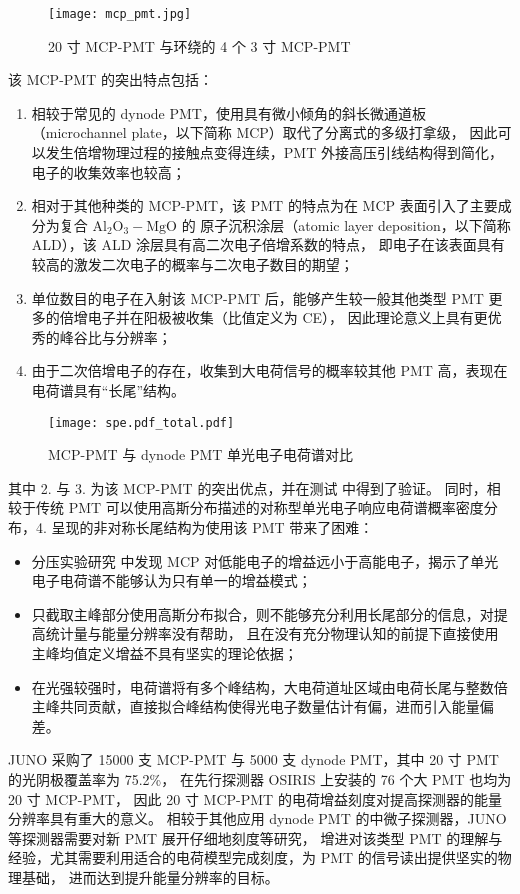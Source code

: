 \begin{figure}
    \centering
    \texttt{[image: mcp\_pmt.jpg]}
    \caption{20 寸 MCP-PMT 与环绕的 4 个 3 寸 MCP-PMT}
\end{figure}

该 MCP-PMT 的突出特点包括：
\begin{enumerate}
    \item 相较于常见的 dynode PMT，使用具有微小倾角的斜长微通道板（microchannel plate，以下简称 MCP）取代了分离式的多级打拿级，
    因此可以发生倍增物理过程的接触点变得连续，PMT 外接高压引线结构得到简化，电子的收集效率也较高；
    \item 相对于其他种类的 MCP-PMT，该 PMT 的特点为在 MCP 表面引入了主要成分为复合 $\text{Al}_2\text{O}_3-\text{MgO}$ 的
    原子沉积涂层（atomic layer deposition，以下简称 ALD），该 ALD 涂层具有高二次电子倍增系数的特点\cite{caoSecondaryElectronEmission2021}，
    即电子在该表面具有较高的激发二次电子的概率与二次电子数目的期望；
    \item 单位数目的电子在入射该 MCP-PMT 后，能够产生较一般其他类型 PMT 更多的倍增电子并在阳极被收集（比值定义为 CE），
    因此理论意义上具有更优秀的峰谷比与分辨率；
    \item 由于二次倍增电子的存在，收集到大电荷信号的概率较其他 PMT 高，表现在电荷谱具有“长尾”结构。
\end{enumerate}

\begin{figure}
    \centering
    \texttt{[image: spe.pdf\_total.pdf]}
    \caption{MCP-PMT 与 dynode PMT 单光电子电荷谱对比\cite{wengSingleElectronCharge2024}}
\end{figure}

其中 2. 与 3. 为该 MCP-PMT 的突出优点，并在测试\cite{zhangPerformanceEvaluation8inch2023} 中得到了验证。
同时，相较于传统 PMT 可以使用高斯分布描述的对称型单光电子响应电荷谱概率密度分布，4. 呈现的非对称长尾结构为使用该 PMT 带来了困难：
\begin{itemize}
    \item 分压实验研究\cite{yangMCPPerformanceImprovement2017} 中发现 MCP 对低能电子的增益远小于高能电子，揭示了单光电子电荷谱不能够认为只有单一的增益模式；
    \item 只截取主峰部分使用高斯分布拟合，则不能够充分利用长尾部分的信息，对提高统计量与能量分辨率没有帮助，
    且在没有充分物理认知的前提下直接使用主峰均值定义增益不具有坚实的理论依据；
    \item 在光强较强时，电荷谱将有多个峰结构，大电荷道址区域由电荷长尾与整数倍主峰共同贡献，直接拟合峰结构使得光电子数量估计有偏，进而引入能量偏差。
\end{itemize}

JUNO 采购了 15000 支 MCP-PMT 与 5000 支 dynode PMT，其中 20 寸 PMT 的光阴极覆盖率为 75.2\%，
在先行探测器 OSIRIS 上安装的 76 个大 PMT 也均为 20 寸 MCP-PMT，
因此 20 寸 MCP-PMT 的电荷增益刻度对提高探测器的能量分辨率具有重大的意义。
相较于其他应用 dynode PMT 的中微子探测器，JUNO 等探测器需要对新 PMT 展开仔细地刻度等研究，
增进对该类型 PMT 的理解与经验，尤其需要利用适合的电荷模型完成刻度，为 PMT 的信号读出提供坚实的物理基础，
进而达到提升能量分辨率的目标。
